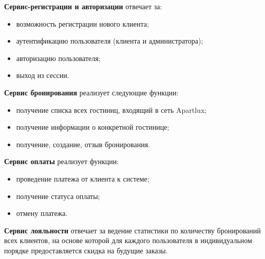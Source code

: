 \textbf{Сервис-регистрации и авторизации} отвечает за:
\begin{itemize}
	\item возможность регистрации нового клиента;
	
	\item аутентификацию пользователя (клиента и администратора);
	
	\item авторизацию пользователя;
	
	\item выход из сессии.
\end{itemize}

\textbf{Сервис бронирования} реализует следующие функции:
\begin{itemize}
	\item получение списка всех гостиниц, входящий в сеть Apartlux;
	
	\item получение информации о конкретной гостинице;
	
	\item получение, создание, отзыв бронирования.
\end{itemize}

\textbf{Сервис оплаты} реализует функции:
\begin{itemize}
	\item проведение платежа от клиента к системе;
	
	\item получение статуса оплаты;
	
	\item отмену платежа.
\end{itemize}

\textbf{Сервис лояльности} отвечает за ведение статистики по количеству бронирований всех клиентов, на основе которой для каждого пользователя в индивидуальном порядке предоставляется скидка на будущие заказы.

